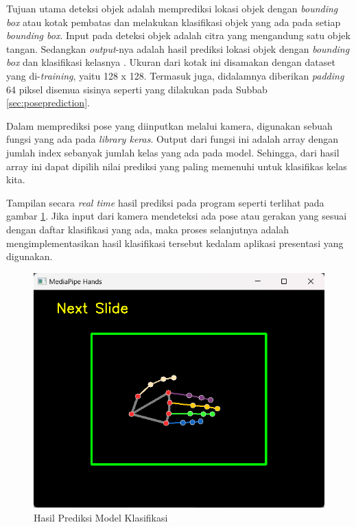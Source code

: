 Tujuan utama deteksi objek adalah memprediksi lokasi objek dengan \emph{bounding box} atau kotak pembatas dan melakukan klasifikasi objek yang ada pada setiap \emph{bounding box}. Input pada deteksi objek adalah citra yang mengandung satu objek tangan. Sedangkan \emph{output}-nya adalah hasil prediksi lokasi objek dengan \emph{bounding box} dan klasifikasi kelasnya \parencite{MElgendy}. Ukuran dari kotak ini disamakan dengan dataset yang di-\emph{training}, yaitu 128 x 128. Termasuk juga, didalamnya diberikan \emph{padding} 64 piksel disemua sisinya seperti yang dilakukan pada Subbab \ref{sec:poseprediction}.

Dalam memprediksi pose yang diinputkan melalui kamera, digunakan sebuah fungsi yang ada pada \emph{library keras}. Output dari fungsi ini adalah array dengan jumlah index sebanyak jumlah kelas yang ada pada model. Sehingga, dari hasil array ini dapat dipilih nilai prediksi yang paling memenuhi untuk klasifikas kelas kita. 

Tampilan secara \emph{real time} hasil prediksi pada program seperti terlihat pada gambar \ref{fig:hasilprediksimodelklasifikasi}. Jika input dari kamera mendeteksi ada pose atau gerakan yang sesuai dengan daftar klasifikasi yang ada, maka proses selanjutnya adalah mengimplementasikan hasil klasifikasi tersebut kedalam aplikasi presentasi yang digunakan.

\begin{figure}[ht]
  \centering
  \includegraphics[scale=0.6]{gambar/hasil-prediksi-model-klasifikasi.png}
  \caption{Hasil Prediksi Model Klasifikasi}
  \label{fig:hasilprediksimodelklasifikasi}
\end{figure}

